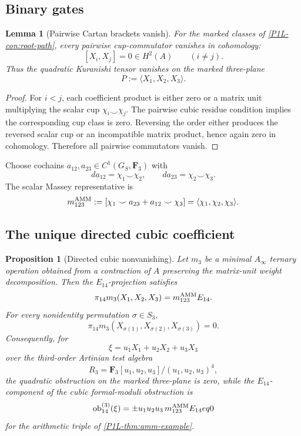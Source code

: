 \documentclass[11pt]{article}
\newtheorem{proposition}[theorem]{Proposition}
\newtheorem{lemma}[theorem]{Lemma}
\theoremstyle{remark}
\newcommand{\F}{\mathbf F}
\providecommand{\ob}{\operatorname{ob}}
\begin{document}
\subsection{Binary gates}

\begin{lemma}[Pairwise Cartan brackets vanish]\label{P1L-prop:pairwise-brackets}
For the marked classes of \cref{P1L-con:root-path}, every pairwise cup-commutator vanishes in cohomology:
\[
 [X_i,X_j]=0\in H^2(A)
 \qquad(i\neq j).
\]
Thus the quadratic Kuranishi tensor vanishes on the marked three-plane
\[
 P:=\langle X_1,X_2,X_3\rangle.
\]
\end{lemma}

\begin{proof}
For \(i<j\), each coefficient product is either zero or a matrix unit multiplying the scalar cup \(\chi_i\smile\chi_j\).  The pairwise cubic residue condition implies the corresponding cup class is zero.  Reversing the order either produces the reversed scalar cup or an incompatible matrix product, hence again zero in cohomology.  Therefore all pairwise commutators vanish.
\end{proof}

Choose cochains \(a_{12},a_{23}\in C^1(G_S,\F_3)\) with
\[
 da_{12}=\chi_1\smile\chi_2,
 \qquad
 da_{23}=\chi_2\smile\chi_3.
\]
The scalar Massey representative is
\begin{equation}\label{P1L-eq:massey-rep}
 m_{123}^{\rm AMM}
 :=
 [\chi_1\smile a_{23}+a_{12}\smile\chi_3]
 =\langle\chi_1,\chi_2,\chi_3\rangle.
\end{equation}

\subsection{The unique directed cubic coefficient}

\begin{proposition}[Directed cubic nonvanishing]\label{P1L-thm:111-jet}
Let \(m_3\) be a minimal \(A_\infty\) ternary operation obtained from a contraction of \(A\) preserving the matrix-unit weight decomposition.  Then the \(E_{14}\)-projection satisfies
\begin{equation}\label{P1L-eq:m3-root}
 \pi_{14}m_3(X_1,X_2,X_3)=m_{123}^{\rm AMM}E_{14}.
\end{equation}
For every nonidentity permutation \(\sigma\in S_3\),
\begin{equation}\label{P1L-eq:perm-zero}
 \pi_{14}m_3(X_{\sigma(1)},X_{\sigma(2)},X_{\sigma(3)})=0.
\end{equation}
Consequently, for
\[
 \xi=u_1X_1+u_2X_2+u_3X_3
\]
over the third-order Artinian test algebra
\[
 R_3=\F_3[u_1,u_2,u_3]/(u_1,u_2,u_3)^4,
\]
the quadratic obstruction on the marked three-plane is zero, while the \(E_{14}\)-component of the cubic formal-moduli obstruction is
\begin{equation}\label{P1L-eq:formal-111}
 \ob^{(3)}_{14}(\xi)
 =\pm u_1u_2u_3\,m_{123}^{\rm AMM}E_{14}
eq0
\end{equation}
for the arithmetic triple of \cref{P1L-thm:amm-example}.
\end{proposition}
\end{document}
